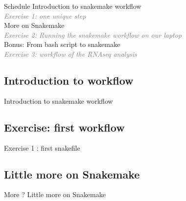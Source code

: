 
\begin{frame}{Schedule}
Introduction to snakemake workflow\\
\quad \quad \textcolor{gray}{\it Exercise 1: one unique step}\\
More on Snakemake\\
\quad \quad \textcolor{gray}{\it Exercise 2: Running the snakemake workflow on our laptop}\\
Bonus: From bash script to snakemake\\
\quad \quad \textcolor{gray}{\it Exercise 3: workflow of the RNAseq analysis}\\

\end{frame}

\subsection[WorkflowIntro]{Introduction to workflow}
\begin{frame}{}
    \huge{Introduction to snakemake workflow}
\end{frame}


\subsection[SnakemakeEx1]{Exercise: first workflow}
\begin{frame}{}
    \huge{Exercise 1 : first snakefile}
\end{frame}


\subsection[bash2snakemake]{Little more on Snakemake}
\begin{frame}{More ?}
    \huge{Little more on Snakemake}
\end{frame}



